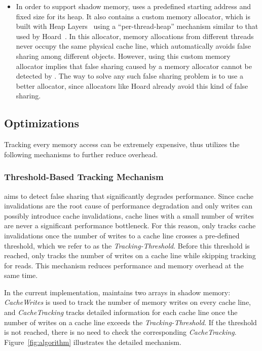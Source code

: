 \begin{itemize}
\item
In order to support shadow memory, \Predator{} uses a predefined
starting address and fixed size for its heap.  It also contains a
custom memory allocator, which is built with Heap
Layers~\cite{heaplayers} using a ``per-thread-heap'' mechanism similar
to that used by Hoard~\cite{Hoard}.  In this allocator, memory
allocations from different threads never occupy the same physical
cache line, which automatically avoids false sharing among different
objects.  However, using this custom memory allocator implies that
false sharing caused by a memory allocator cannot be detected
by \Predator{}. The way to solve any such false sharing problem is to use a
better allocator, since allocators like Hoard already avoid this kind of false
sharing.

\end{itemize} 
 
\subsection{Optimizations}
\label{optimization}
Tracking every memory access can be extremely expensive, thus 
\Predator{} utilizes the following mechanisms to further reduce overhead.

\subsubsection{Threshold-Based Tracking Mechanism}
\label{sec:thresholdtracking}
\Predator{} aims to detect false sharing that significantly degrades performance.
Since cache invalidations are the root cause of performance degradation and only writes 
can possibly introduce cache invalidations, 
cache lines with a small number of writes are never a significant performance bottleneck.
For this reason, \Predator{} only tracks cache invalidations
once the number of writes to a cache line crosses a
pre-defined threshold, which we refer to as the {\it Tracking-Threshold}. 
Before this threshold is reached, \Predator{} only tracks the number of writes on a cache line 
while skipping tracking for reads.
This mechanism reduces performance and memory overhead
at the same time.

In the current implementation, \Predator{} maintains two arrays in shadow memory: 
{\it CacheWrites} is used to track the number of memory writes on every cache line, and
{\it CacheTracking} tracks detailed information 
for each cache line once the number of writes on a cache line exceeds
the {\it Tracking-Threshold}. 
If the threshold is not reached, there is no need to check the corresponding {\it CacheTracking}. 
Figure~\ref{fig:algorithm} illustrates the detailed mechanism.

